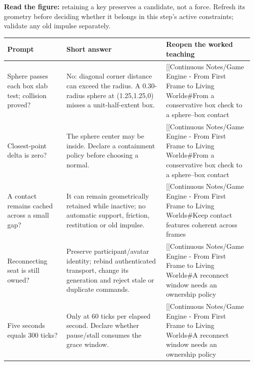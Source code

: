 \hypertarget{appendix-64ea716dcadc-contact-candidates-active-constraints-and-surviving-identities}{}


\textbf{Read the figure:} retaining a key preserves a candidate, not a force. Refresh its geometry before deciding whether it belongs in this step's active constraints; validate any old impulse separately.

{\def\LTcaptype{none} %
\begin{longtable}[]{@{}
  >{\raggedright\arraybackslash}p{}
  >{\raggedright\arraybackslash}p{}
  >{\raggedright\arraybackslash}p{}@{}}
\toprule\noalign{}
\begin{minipage}[b]{\linewidth}\raggedright
Prompt
\end{minipage} & \begin{minipage}[b]{\linewidth}\raggedright
Short answer
\end{minipage} & \begin{minipage}[b]{\linewidth}\raggedright
Reopen the worked teaching
\end{minipage} \\
\midrule\noalign{}
\endhead
\bottomrule\noalign{}
\endlastfoot
Sphere passes each box slab test; collision proved? & No: diagonal corner distance can exceed the radius. A 0.30-radius sphere at (1.25,1.25,0) misses a unit-half-extent box. & {[}{[}Continuous Notes/Game Engine - From First Frame to Living Worlds\#From a conservative box check to a sphere--box contact \\
Closest-point delta is zero? & The sphere center may be inside. Declare a containment policy before choosing a normal. & {[}{[}Continuous Notes/Game Engine - From First Frame to Living Worlds\#From a conservative box check to a sphere--box contact \\
A contact remains cached across a small gap? & It can remain geometrically retained while inactive; no automatic support, friction, restitution or old impulse. & {[}{[}Continuous Notes/Game Engine - From First Frame to Living Worlds\#Keep contact features coherent across frames \\
Reconnecting seat is still owned? & Preserve participant/avatar identity; rebind authenticated transport, change its generation and reject stale or duplicate commands. & {[}{[}Continuous Notes/Game Engine - From First Frame to Living Worlds\#A reconnect window needs an ownership policy \\
Five seconds equals 300 ticks? & Only at 60 ticks per elapsed second. Declare whether pause/stall consumes the grace window. & {[}{[}Continuous Notes/Game Engine - From First Frame to Living Worlds\#A reconnect window needs an ownership policy \\
\end{longtable}
}

